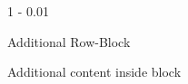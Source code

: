 \documentclass{postertheme}\usepackage[]{graphicx}\usepackage[]{color}
\begin{document}
\begin{frame}

\begin{columns}[onlytextwidth]
  
  \begin{column}{1 \textwidth - 0.01 \textwidth}
    \begin{block}{Additional Row-Block}
        
      Additional content inside block
        
    \end{block}
  \end{column}
\end{columns}

\end{frame}
\end{document}
